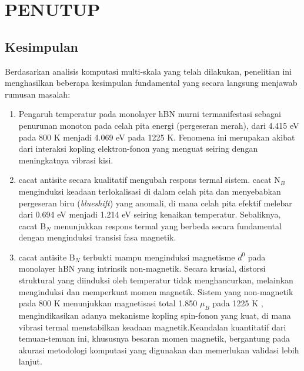 \renewcommand{\thechapter}{\Roman{chapter}}
\chapter{PENUTUP}
\renewcommand{\thechapter}{\arabic{chapter}}

\section{Kesimpulan}
\label{sec:kesimpulan}
Berdasarkan analisis komputasi multi-skala yang telah dilakukan, penelitian ini menghasilkan beberapa kesimpulan fundamental yang secara langsung menjawab rumusan masalah:
\begin{enumerate}
    \item Pengaruh temperatur pada monolayer hBN murni termanifestasi sebagai penurunan monoton pada celah pita energi (pergeseran merah), dari 4.415 eV pada 800 K menjadi 4.069 eV pada 1225 K. Fenomena ini merupakan akibat dari interaksi kopling elektron-fonon yang menguat seiring dengan meningkatnya vibrasi kisi.

    \item cacat antisite secara kualitatif mengubah respons termal sistem. cacat N$_B$ menginduksi keadaan terlokalisasi di dalam celah pita dan menyebabkan pergeseran biru (\textit{blueshift}) yang anomali, di mana celah pita efektif melebar dari 0.694 eV menjadi 1.214 eV seiring kenaikan temperatur. Sebaliknya, cacat B$_N$ menunjukkan respons termal yang berbeda secara fundamental dengan menginduksi transisi fasa magnetik.

    \item cacat antisite B$_N$ terbukti mampu menginduksi magnetisme $d^0$ pada monolayer hBN yang intrinsik non-magnetik. Secara krusial, distorsi struktural yang diinduksi oleh temperatur tidak menghancurkan, melainkan menginduksi dan memperkuat momen magnetik. Sistem yang non-magnetik pada 800 K menunjukkan magnetisasi total 1.850 $\mu_B$ pada 1225 K , mengindikasikan adanya mekanisme kopling spin-fonon yang kuat, di mana vibrasi termal menstabilkan keadaan magnetik.Keandalan kuantitatif dari temuan-temuan ini, khususnya besaran momen magnetik, bergantung pada akurasi metodologi komputasi yang digunakan dan memerlukan validasi lebih lanjut.
\end{enumerate}

